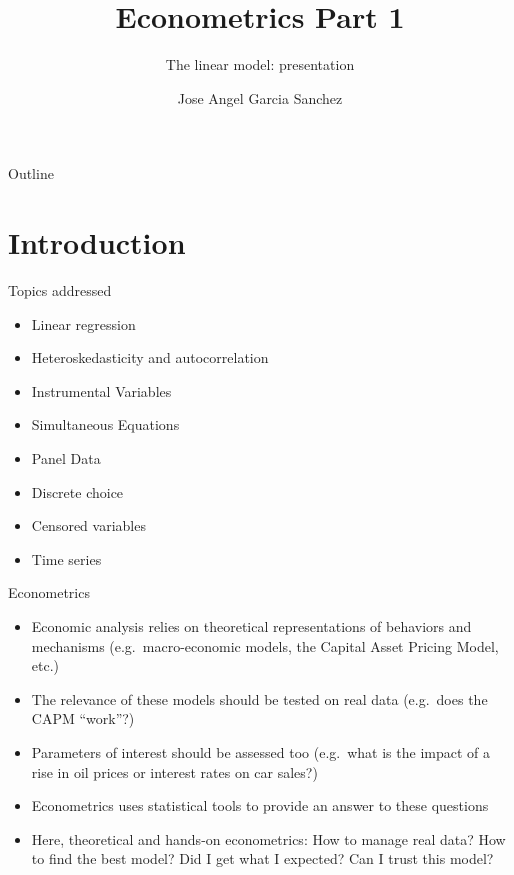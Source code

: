 \documentclass[aspectratio=169]{beamer}
\title{Econometrics Part 1}
\subtitle{The linear model: presentation}
\author{Jose Angel Garcia Sanchez}
\institute{Université Paris 1 Panthéon-Sorbonne}
\date{} %
\begin{document}
{
\begin{frame}
\titlepage
\end{frame}
}

\begin{frame}{Outline}
\tableofcontents
\end{frame}

\section{Introduction}

\begin{frame}{Topics addressed}
\begin{itemize}
    \item Linear regression
    \item Heteroskedasticity and autocorrelation
    \item Instrumental Variables
    \item Simultaneous Equations
    \item Panel Data
    \item Discrete choice
    \item Censored variables
    \item Time series
\end{itemize}
\end{frame}

\begin{frame}{Econometrics}
\begin{itemize}
    \item Economic analysis relies on theoretical representations of behaviors and mechanisms (e.g.\ macro-economic models, the Capital Asset Pricing Model, etc.)
    \item The relevance of these models should be tested on real data (e.g.\ does the CAPM ``work''?)
    \item Parameters of interest should be assessed too (e.g.\ what is the impact of a rise in oil prices or interest rates on car sales?)
    \item Econometrics uses statistical tools to provide an answer to these questions
    \item Here, theoretical and hands-on econometrics: How to manage real data? How to find the best model? Did I get what I expected? Can I trust this model?
\end{itemize}
\end{frame}
\end{document}
